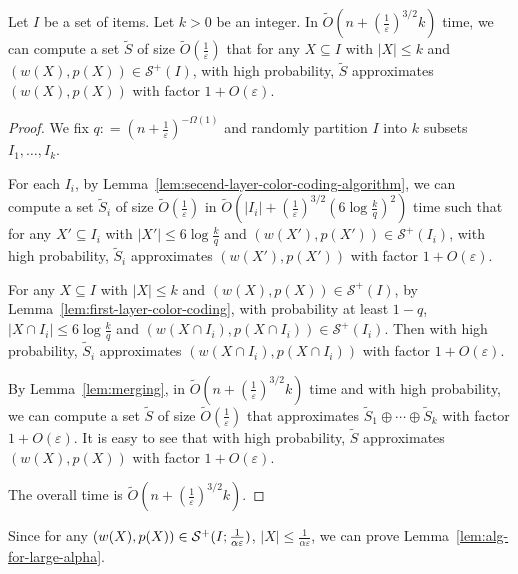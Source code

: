 \documentclass[a4paper,UKenglish,cleveref, autoref, thm-restate, pdfa]{lipics-v2021}
\newcommand{\eps}{\varepsilon}
\renewcommand{\leq}{\leqslant}
\begin{document}
\begin{lemma}\label{lem:first-layer-color-coding-algorithm}
    Let $I$ be a set of items. Let $k>0$ be an integer. In $\tilde{O}(n + (\frac{1}{\eps})^{3/2}k)$ time, we can compute a set $\tilde{S}$ of size $\tilde{O}(\frac{1}{\eps})$ that for any $X \subseteq I$ with $|X| \leq k$ and $(w(X),p(X))\in \mathcal{S}^+(I)$, with high probability, $\tilde{S}$ approximates $(w(X), p(X))$ with factor $1 + O(\eps)$.
\end{lemma}
\begin{proof}
    We fix $q: = (n + \frac{1}{\eps})^{-\Omega(1)}$ and randomly partition $I$ into $k$ subsets $I_1,\ldots,I_{k}$. 
    
    For each $I_i$, by Lemma~\ref{lem:secend-layer-color-coding-algorithm}, we can compute a set $\tilde{S}_i$ of size $\tilde{O}(\frac{1}{\eps})$ in $\tilde{O}(|I_i|+(\frac{1}{\eps})^{3/2}(6\log\frac{k}{q})^2)$ time such that for any $X' \subseteq I_i$ with $|X'| \leq 6\log\frac{k}{q}$ and $(w(X'),p(X'))\in \mathcal{S}^+(I_i)$, with high probability, $\tilde{S}_i$ approximates $(w(X'), p(X'))$ with factor $1 + O(\eps)$.
    
    For any $X \subseteq I$ with $|X| \leq k$ and $(w(X),p(X))\in \mathcal{S}^+(I)$, by Lemma~\ref{lem:first-layer-color-coding}, with probability at least $1-q$, $|X\cap I_i|\leq 6\log\frac{k}{q}$ and $(w(X\cap I_i),p(X\cap I_i))\in \mathcal{S}^+(I_i)$. Then with high probability, $\tilde{S}_i$ approximates $(w(X\cap I_i), p(X\cap I_i))$ with factor $1 + O(\eps)$.

    By Lemma~\ref{lem:merging}, in $\tilde{O}(n+(\frac{1}{\eps})^{3/2}k)$ time and with high probability, we can compute a set $\tilde{S}$ of size $\tilde{O}(\frac{1}{\eps})$ that approximates $\tilde{S}_1\oplus\cdots\oplus\tilde{S}_k$ with factor $1 + O(\eps)$. It is easy to see that with high probability, $\tilde{S}$ approximates $(w(X),p(X))$ with factor $1 + O(\eps)$.

    The overall time is $\tilde{O}(n+(\frac{1}{\eps})^{3/2}k)$.
\end{proof}

Since for any $(w(X),p(X))\in {\cal S}^+(I;\frac{1}{\alpha\eps})$, $|X|\leq \frac{1}{\alpha\eps}$, we can prove Lemma~\ref{lem:alg-for-large-alpha}.
\end{document}
